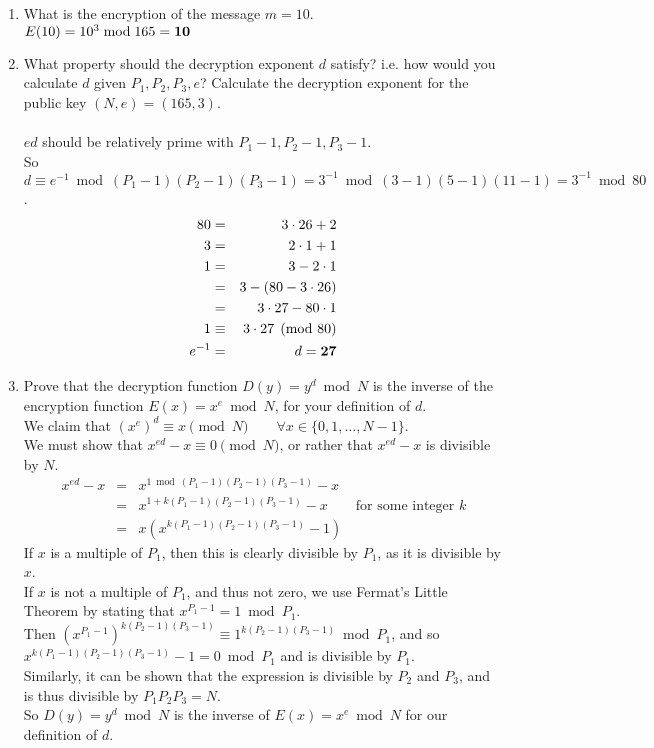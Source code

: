 \documentclass[11pt,fleqn]{article}
\begin{document}
\begin{enumerate}
\begin{enumerate}
\item What is the encryption of the message $m = 10$. \\
$E(10) = 10^3 \bmod{165} = {\bf 10}$ 
\item What property should the decryption exponent $d$ satisfy? i.e. 
how would you calculate $d$ given $P_1, P_2, P_3, e$?
Calculate the decryption exponent for the public key $(N, e) = (165, 3)$. \\ \\
$ed$ should be relatively prime with $P_1-1, P_2-1, P_3-1$. \\
So $d \equiv e^{-1} \bmod{(P_1-1)(P_2-1)(P_3-1)} = 3^{-1} \bmod{(3-1)(5-1)(11-1)} = 3^{-1} \bmod{80}$. \\
\begin{eqnarray*}
80 & = & 3 \cdot 26 + 2 \\
3 & = & 2 \cdot 1 + 1 \\
1 & = & 3 - 2 \cdot 1 \\
  & = & 3 - (80 - 3 \cdot 26) \\
  & = & 3 \cdot 27 - 80 \cdot 1 \\
1 & \equiv & 3 \cdot 27 \pmod{80} \\
e^{-1} & = & d = {\bf 27}
\end{eqnarray*}
\item Prove that the decryption function $D(y) = y^d \bmod N$ is the inverse 
of the encryption function $E(x) = x^e \bmod N$, for your definition of $d$. \\
We claim that $(x^e)^d \equiv x \pmod{N} \qquad \forall x \in \{0,1,\ldots,N-1\}$. \\
We must show that $x^{ed} - x \equiv 0 \pmod{N}$, or rather that $x^{ed} - x$ is divisible by $N$. 
\begin{eqnarray*}
x^{ed}-x & = & x^{1 \bmod{(P_1-1)(P_2-1)(P_3-1)}}-x \\
 & = & x^{1+k(P_1-1)(P_2-1)(P_3-1)}-x \qquad \text{for some integer } k \\
 & = & x(x^{k(P_1-1)(P_2-1)(P_3-1)}-1)
\end{eqnarray*}
If $x$ is a multiple of $P_1$, then this is clearly divisible by $P_1$, as it is divisible by $x$. \\
If $x$ is not a multiple of $P_1$, and thus not zero, we use Fermat's Little Theorem by stating that $x^{P_1-1} = 1 \bmod{P_1}$. \\
Then $(x^{P_1-1})^{k(P_2-1)(P_3-1)} \equiv 1^{k(P_2-1)(P_3-1)} \bmod{P_1}$, and so $x^{k(P_1-1)(P_2-1)(P_3-1)} - 1 = 0 \bmod{P_1}$ and is divisible by $P_1$. \\
Similarly, it can be shown that the expression is divisible by $P_2$ and $P_3$, and is thus divisible by $P_1 P_2 P_3 = N$. \\
So $D(y) = y^d \bmod N$ is the inverse of $E(x) = x^e \bmod N$ for our definition of $d$.
\end{enumerate}


\end{enumerate}
\end{document}
